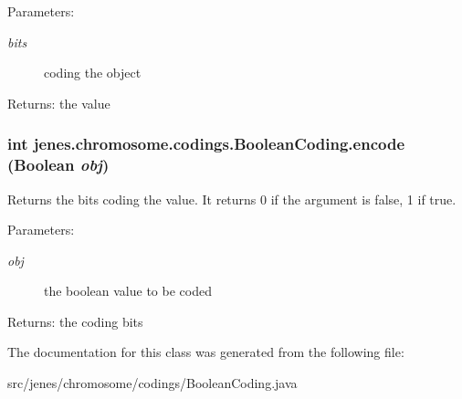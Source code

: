 \begin{Desc}
\item[Parameters:]
\begin{description}
\item[{\em bits}]coding the object \end{description}
\end{Desc}
\begin{Desc}
\item[Returns:]the value \end{Desc}
\hypertarget{classjenes_1_1chromosome_1_1codings_1_1_boolean_coding_ce4181a4ef8bf37d9ad762d15422527b}{
\subsubsection[encode]{\setlength{\rightskip}{0pt plus 5cm}int jenes.chromosome.codings.BooleanCoding.encode (Boolean {\em obj})}}
\label{classjenes_1_1chromosome_1_1codings_1_1_boolean_coding_ce4181a4ef8bf37d9ad762d15422527b}


Returns the bits coding the value. It returns 0 if the argument is false, 1 if true.

\begin{Desc}
\item[Parameters:]
\begin{description}
\item[{\em obj}]the boolean value to be coded \end{description}
\end{Desc}
\begin{Desc}
\item[Returns:]the coding bits \end{Desc}


The documentation for this class was generated from the following file:\begin{CompactItemize}
\item 
src/jenes/chromosome/codings/BooleanCoding.java\end{CompactItemize}
